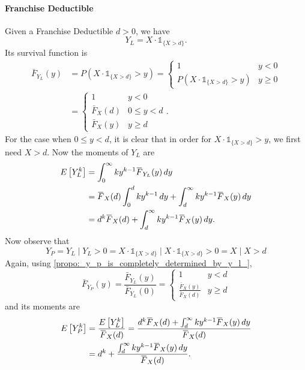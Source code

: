 \documentclass[notoc,notitlepage]{tufte-book}
\begin{document}
\paragraph{Franchise Deductible} Given a Franchise Deductible $d > 0$, we have
\begin{equation*}
  Y_L = X \cdot \mathbb{1}_{\{X > d\}}.
\end{equation*}
Its survival function is
\begin{align*}
  \bar{F}_{Y_L}(y) &= P ( X \cdot \mathbb{1}_{\{X > d\}} > y ) = \begin{cases}
                     1 & y < 0 \\
                     P ( X \cdot \mathbb{1}_{\{X > d\}} > y ) & y \geq 0
                   \end{cases} \\
                   &= \begin{cases}
                     1 & y < 0 \\
                     \bar{F}_X(d) & 0 \leq y < d \\
                     \bar{F}_X(y) & y \geq d
                   \end{cases}.
\end{align*}
For the case when $0 \leq y < d$, it is clear that in order for $X \cdot \mathbb{1}_{\{X > d\}} > y$, we first need $X > d$. Now the moments of $Y_L$ are
\begin{align*}
  E \left[ Y_L^k \right] &= \int_{0}^{\infty} ky^{k - 1} \bar{F}_{Y_L}(y) \dif{y} \\
                         &= \bar{F}_X(d) \int_{0}^{d} ky^{k - 1} \dif{y} + \int_{d}^{\infty} k y^{k - 1} \bar{F}_X(y) \dif{y} \\
                         &= d^k \bar{F}_X(d) + \int_{d}^{\infty} ky^{k - 1} \bar{F}_X(y) \dif{y}.
\end{align*}
Now observe that
\begin{equation*}
  Y_P = Y_L \mid Y_L > 0 = X \cdot \mathbb{1}_{\{X > d\}} \mid X \cdot \mathbb{1}_{\{X > d\}} > 0 = X \mid X > d
\end{equation*}
Again, using \cref{propo:_y_p_is_completely_determined_by_y_l_}, 
\begin{equation*}
  \bar{F}_{Y_P}(y) = \frac{\bar{F}_{Y_L}(y)}{\bar{F}_{Y_L}(0)} = \begin{cases}
    1                                 & y < d \\
    \frac{\bar{F}_X(y)}{\bar{F}_X(d)} & y \geq d
  \end{cases}
\end{equation*}
and its moments are
\begin{align*}
  E \left[ Y_P^k \right] &= \frac{E \left[ Y_L^k \right]}{\bar{F}_X(d)} = \frac{d^k \bar{F}_X(d) + \int_{d}^{\infty} ky^{k - 1} \bar{F}_X(y) \dif{y}}{\bar{F}_X(d)} \\
                         &= d^k + \frac{\int_{d}^{\infty} ky^{k - 1} \bar{F}_X(y) \dif{y}}{\bar{F}_X(d)}.
\end{align*}
\end{document}
